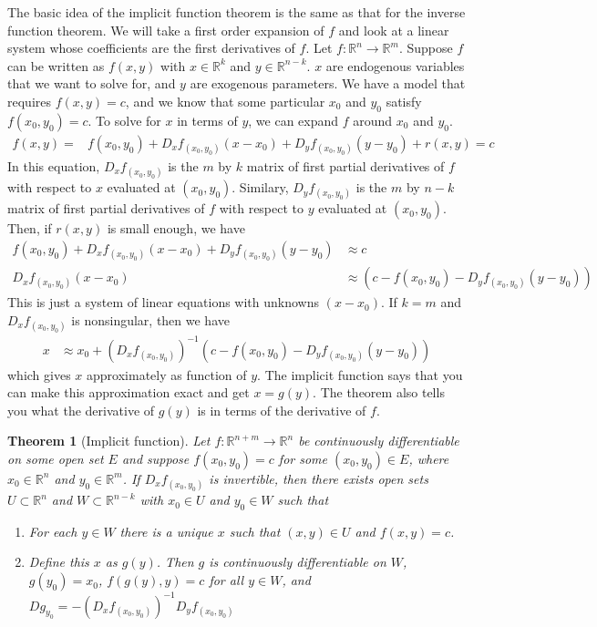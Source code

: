 \documentclass[12pt,reqno]{amsart}
\newtheorem{theorem}{Theorem}[section]
\theoremstyle{definition}
\def\R{\mathbb{R}}
\renewcommand{\to}{{\rightarrow}}
\begin{document}
The basic idea of the implicit function theorem is the same as that
for the inverse function theorem. We will take a first order expansion
of $f$ and look at a linear system whose coefficients are the first
derivatives of $f$. Let $f: \R^n \to \R^m$. Suppose $f$ can be written
as $f(x,y)$ with $x \in \R^k$ and $y \in \R^{n-k}$. $x$ are endogenous
variables that we want to solve for, and $y$ are exogenous
parameters. We have a model that requires $f(x,y) = c$, and we know
that some particular $x_0$ and $y_0$ satisfy $f(x_0,y_0) = c$. To
solve for $x$ in terms of $y$, we can expand $f$ around $x_0$ and
$y_0$. 
\begin{align*}
  f(x,y) = & f(x_0,y_0) + D_xf_{(x_0,y_0)} (x-x_0) + D_yf_{(x_0,y_0)}
  (y-y_0) + r(x,y) = c 
\end{align*}
In this equation, $D_xf_{(x_0,y_0)}$ is the $m$ by $k$ matrix of first
partial derivatives of $f$ with respect to $x$ evaluated at
$(x_0,y_0)$. Similary,  $D_yf_{(x_0,y_0)}$ is the $m$ by $n-k$ matrix of first
partial derivatives of $f$ with respect to $y$ evaluated at
$(x_0,y_0)$.  Then, if $r(x,y)$ is small enough, we have
\begin{align*}
  f(x_0,y_0) + D_xf_{(x_0,y_0)} (x-x_0) + D_yf_{(x_0,y_0)}
 (y-y_0) & \approx c \\
 D_xf_{(x_0,y_0)} (x-x_0) & \approx \left(c -  f(x_0,y_0) -
   D_yf_{(x_0,y_0)} (y-y_0)\right) 
\end{align*}
This is just a system of linear equations with unknowns $(x-x_0)$. If
$k=m$ and $D_xf_{(x_0,y_0)}$ is nonsingular, then we have
\begin{align*}
  x & \approx x_0 + \left(D_x f_{(x_0,y_0)}\right)^{-1} \left(c -  f(x_0,y_0) -
   D_yf_{(x_0,y_0)} (y-y_0)\right) 
\end{align*}
which gives $x$ approximately as function of $y$. The implicit
function says that you can make this approximation exact and get
$x=g(y)$. The theorem also tells you what the derivative of $g(y)$ is
in terms of the derivative of $f$.
\begin{theorem}[Implicit function]\label{thm:implicit}
  Let $f:\R^{n+m} \to \R^n$ be continuously differentiable on some open
  set $E$ and suppose $f(x_0,y_0) = c$ for some $(x_0,y_0) \in E$,
  where $x_0 \in \R^n$ and $y_0 \in \R^m$. If 
  $D_xf_{(x_0,y_0)}$ is invertible, then there exists open sets $U
  \subset \R^n$ and $W \subset \R^{n-k}$ with $x_0 \in U$ and
  $y_0 \in W$ such that 
  \begin{enumerate}
  \item\label{imp1} 
    For each $y\in W$ there is a unique $x$ such that $(x,y) \in
    U$ and $f(x,y) = c$.
  \item\label{imp2}
    Define this $x$ as $g(y)$. Then $g$ is continuously
    differentiable on $W$, $g(y_0) = x_0$,
    $f(g(y),y) = c$ for all $y
    \in W$, and $Dg_{y_0} = -\left(D_xf_{(x_0,y_0)}\right)^{-1}
    D_yf_{(x_0,y_0)}$ 
  \end{enumerate}
\end{theorem}
\end{document}
